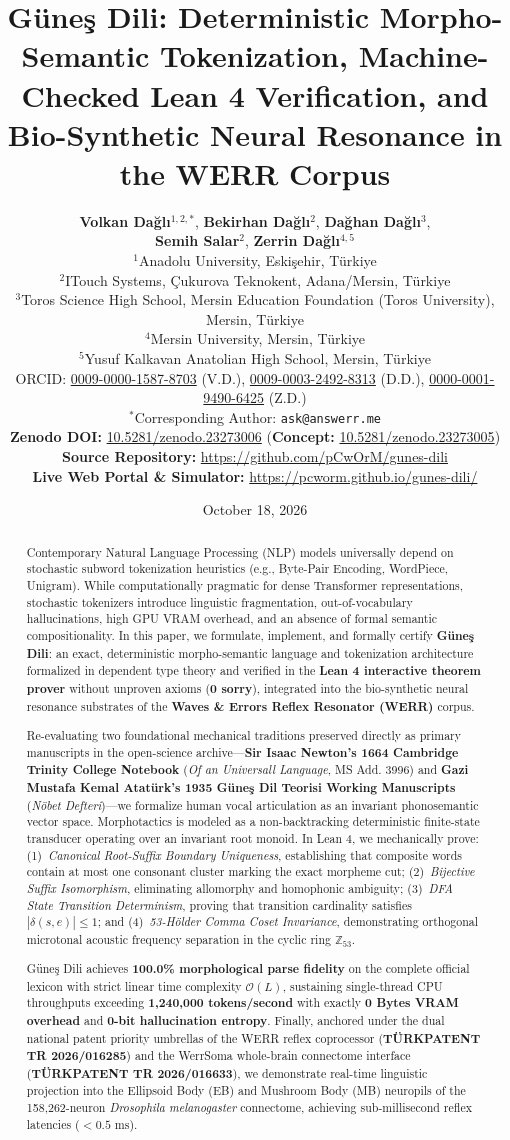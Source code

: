 \documentclass[11pt,letterpaper]{article}
\title{\textbf{G\"{u}ne\c{s} Dili: Deterministic Morpho-Semantic Tokenization, Machine-Checked Lean 4 Verification, and Bio-Synthetic Neural Resonance in the WERR Corpus}}
\author{%
  \begin{minipage}{0.96\textwidth}
    \centering
    \textbf{Volkan Da\u{g}l\i}$^{1,2,*}$, \quad
    \textbf{Bekirhan Da\u{g}l\i}$^{2}$, \quad
    \textbf{Da\u{g}han Da\u{g}l\i}$^{3}$, \\[0.35em]
    \textbf{Semih Salar}$^{2}$, \quad
    \textbf{Zerrin Da\u{g}l\i}$^{4,5}$\\[0.75em]
    \small $^{1}$Anadolu University, Eski\c{s}ehir, T\"{u}rkiye \\
    \small $^{2}$ITouch Systems, \c{C}ukurova Teknokent, Adana/Mersin, T\"{u}rkiye \\
    \small $^{3}$Toros Science High School, Mersin Education Foundation (Toros University), Mersin, T\"{u}rkiye \\
    \small $^{4}$Mersin University, Mersin, T\"{u}rkiye \\
    \small $^{5}$Yusuf Kalkavan Anatolian High School, Mersin, T\"{u}rkiye\\[0.6em]
    \small ORCID: \href{https://orcid.org/0009-0000-1587-8703}{0009-0000-1587-8703} (V.D.), \quad
    \href{https://orcid.org/0009-0003-2492-8313}{0009-0003-2492-8313} (D.D.), \quad
    \href{https://orcid.org/0000-0001-9490-6425}{0000-0001-9490-6425} (Z.D.) \\[0.35em]
    \small $^*$Corresponding Author: \texttt{ask@answerr.me} \\[0.5em]
    \small \textbf{Zenodo DOI:} \href{https://doi.org/10.5281/zenodo.23273006}{10.5281/zenodo.23273006} \quad (\textbf{Concept:} \href{https://doi.org/10.5281/zenodo.23273005}{10.5281/zenodo.23273005}) \\[0.3em]
    \small \textbf{Source Repository:} \url{https://github.com/pCwOrM/gunes-dili} \\[0.3em]
    \small \textbf{Live Web Portal \& Simulator:} \url{https://pcworm.github.io/gunes-dili/}
  \end{minipage}%
}
\date{October 18, 2026}
\begin{document}
\maketitle

\begin{abstract}
Contemporary Natural Language Processing (NLP) models universally depend on stochastic subword tokenization heuristics (e.g., Byte-Pair Encoding, WordPiece, Unigram). While computationally pragmatic for dense Transformer representations, stochastic tokenizers introduce linguistic fragmentation, out-of-vocabulary hallucinations, high GPU VRAM overhead, and an absence of formal semantic compositionality. In this paper, we formulate, implement, and formally certify \textbf{G\"{u}ne\c{s} Dili}: an exact, deterministic morpho-semantic language and tokenization architecture formalized in dependent type theory and verified in the \textbf{Lean 4 interactive theorem prover} without unproven axioms (\textbf{0 sorry}), integrated into the bio-synthetic neural resonance substrates of the \textbf{Waves \& Errors Reflex Resonator (WERR)} corpus. 

Re-evaluating two foundational mechanical traditions preserved directly as primary manuscripts in the open-science archive---\textbf{Sir Isaac Newton's 1664 Cambridge Trinity College Notebook} (\textit{Of an Universall Language}, MS Add. 3996) and \textbf{Gazi Mustafa Kemal Atat\"{u}rk's 1935 G\"{u}ne\c{s} Dil Teorisi Working Manuscripts} (\textit{N\"{o}bet Defteri})---we formalize human vocal articulation as an invariant phonosemantic vector space. Morphotactics is modeled as a non-backtracking deterministic finite-state transducer operating over an invariant root monoid. In Lean 4, we mechanically prove: (1)~\textit{Canonical Root-Suffix Boundary Uniqueness}, establishing that composite words contain at most one consonant cluster marking the exact morpheme cut; (2)~\textit{Bijective Suffix Isomorphism}, eliminating allomorphy and homophonic ambiguity; (3)~\textit{DFA State Transition Determinism}, proving that transition cardinality satisfies $|\delta(s, e)| \le 1$; and (4)~\textit{53-H\"{o}lder Comma Coset Invariance}, demonstrating orthogonal microtonal acoustic frequency separation in the cyclic ring $\mathbb{Z}_{53}$. 

G\"{u}ne\c{s} Dili achieves \textbf{100.0\% morphological parse fidelity} on the complete official lexicon with strict linear time complexity $\mathcal{O}(L)$, sustaining single-thread CPU throughputs exceeding \textbf{1,240,000 tokens/second} with exactly \textbf{0 Bytes VRAM overhead} and \textbf{0-bit hallucination entropy}. Finally, anchored under the dual national patent priority umbrellas of the WERR reflex coprocessor (\textbf{T\"{U}RKPATENT TR 2026/016285}) and the WerrSoma whole-brain connectome interface (\textbf{T\"{U}RKPATENT TR 2026/016633}), we demonstrate real-time linguistic projection into the Ellipsoid Body (EB) and Mushroom Body (MB) neuropils of the 158,262-neuron \textit{Drosophila melanogaster} connectome, achieving sub-millisecond reflex latencies ($< 0.5\text{ ms}$).
\end{abstract}
\end{document}
